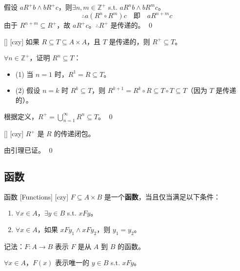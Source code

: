 \documentclass[UTF8]{ctexart}
\begin{document}
            \begin{prf}
            假设 \( a R^+ b \land b R^+ c \)，则\(\exists n, m \in \mathbb{Z}^+ \) s.t. \( a R^n b \land b R^m c \)。
            \[
            \therefore a (R^n \circ R^m) c \quad \text{即} \quad a R^{n+m} c
            \]
            由于 \( R^{n+m} \subseteq R^+ \)，故 \( a R^+ c \)。\( \therefore R^+ \) 是传递的。
            \qed
        \end{prf}

        \begin{lma}
            [UUID]
            {}
            []
            [czy]
            如果 \( R \subseteq T \subseteq A \times A \)，且 \( T \) 是传递的，则 \( R^+ \subseteq T \)。
        \end{lma}

        \begin{prf}
            \(\forall n \in \mathbb{Z}^+ \)，证明 \( R^n \subseteq T \)：
            \begin{itemize}
                \item (1) 当 \( n = 1 \) 时，\( R^1 = R \subseteq T \)。
                \item (2) 假设 \( n = k \) 时 \( R^k \subseteq T \)，则 \( R^{k+1} = R^k \circ R \subseteq T \circ T \subseteq T \)（因为 \( T \) 是传递的）。
            \end{itemize}
            根据定义，\( R^+ = \bigcup_{n=1}^{\infty} R^n \subseteq T \)。
            \qed
        \end{prf}

        \begin{thm}
            [UUID]
            {}
            []
            [czy]
            \( R^+ \) 是 \( R \) 的传递闭包。
        \end{thm}

        \begin{prf}
            由引理已证。
            \qed
        \end{prf}

    \subsection{函数}

        \begin{dfn}
            [UUID]
            {函数}
            [Functions]
            [czy]
            \( F \subseteq A \times B \) 是一个\textbf{函数}，当且仅当满足以下条件：
            \begin{enumerate}
                \item \(\forall x \in A \)，\(\exists y \in B \) s.t. \( x F y \)。
                \item \(\forall x \in A \)，如果 \( x F y_1 \land x F y_2 \)，则 \( y_1 = y_2 \)。
            \end{enumerate}

            记法：\( F: A \rightarrow B \) 表示 \( F \) 是从 \( A \) 到 \( B \) 的函数。

            \(\forall x \in A \)，\( F(x) \) 表示唯一的 \( y \in B \) s.t. \( x F y \)。
        \end{dfn}
\end{document}
